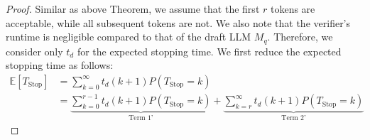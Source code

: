\documentclass{article}
\theoremstyle{plain}
\theoremstyle{definition}
\theoremstyle{remark}
\begin{document}
    
\begin{proof}
    Similar as above Theorem, we assume that the first $r$ tokens are acceptable, while all subsequent tokens are not. We also note that the verifier's runtime is negligible compared to that of the draft LLM \( M_q \). Therefore, we consider only \( t_d \) for the expected stopping time. We first reduce the expected stopping time as follows:
     \begin{align}
     \mathbb{E}[T_\text{Stop}] &=  \sum_{k=0}^\infty t_d(k+1)P(T_\text{Stop}=k)\nonumber\\
     &= \underbrace{\sum_{k=0}^{r-1}t_d(k+1)P(T_\text{Stop}=k)}_{\text{Term 1'}} +\underbrace{\sum_{k=r}^{\infty}t_d(k+1)P(T_\text{Stop}=k)}_\text{Term 2'}     
 \end{align}
    
    
    

\end{proof}
\end{document}
